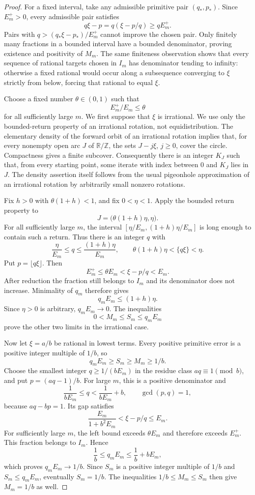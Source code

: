 \documentclass[11pt,a4paper]{article}
\theoremstyle{definition}
\theoremstyle{remark}
\begin{document}
\begin{proof}
For a fixed interval, take any admissible primitive pair $(q_*,p_*)$.
Since $E_m^+>0$, every admissible pair satisfies
\[
 q\xi-p=q(\xi-p/q)\ge qE_m^+.
\]
Pairs with $q>(q_*\xi-p_*)/E_m^+$ cannot improve the chosen pair.
Only finitely many fractions in a bounded interval have a bounded
denominator, proving existence and positivity of $M_m$.
The same finiteness observation shows that every sequence of rational
targets chosen in $I_m$ has denominator tending to infinity: otherwise
a fixed rational would occur along a subsequence converging to $\xi$
strictly from below, forcing that rational to equal $\xi$.

Choose a fixed number $\theta\in(0,1)$ such that
\[
 E_m^+/E_m\le\theta
\]
for all sufficiently large $m$. We first suppose that $\xi$ is irrational.
We use only the bounded-return property of an irrational rotation, not
equidistribution. The elementary density of the forward orbit of an
irrational rotation implies that, for every nonempty open arc $J$ of
$\mathbb R/\mathbb Z$, the sets
$J-j\xi$, $j\ge0$, cover the circle. Compactness gives a finite subcover.
Consequently there is an integer $K_J$ such that, from every starting
point, some iterate with index between $0$ and $K_J$ lies in $J$.
The density assertion itself follows from the usual pigeonhole
approximation of an irrational rotation by arbitrarily small nonzero
rotations.

Fix $h>0$ with $\theta(1+h)<1$, and fix $0<\eta<1$. Apply the bounded
return property to
\[
 J=\bigl(\theta(1+h)\eta,\eta\bigr).
\]
For all sufficiently large $m$, the interval
$[\eta/E_m,(1+h)\eta/E_m]$ is long enough to contain such a return.
Thus there is an integer $q$ with
\[
 \frac{\eta}{E_m}\le q\le\frac{(1+h)\eta}{E_m},
 \qquad \theta(1+h)\eta<\{q\xi\}<\eta.
\]
Put $p=\lfloor q\xi\rfloor$. Then
\[
 E_m^+\le\theta E_m
   <\xi-p/q<E_m.
\]
After reduction the fraction still belongs to $I_m$ and its denominator
does not increase. Minimality of $q_m$ therefore gives
\[
 q_mE_m\le(1+h)\eta.
\]
Since $\eta>0$ is arbitrary, $q_mE_m\to0$. The inequalities
\[
 0<M_m\le S_m\le q_mE_m
\]
prove the other two limits in the irrational case.

Now let $\xi=a/b$ be rational in lowest terms. Every positive primitive
error is a positive integer multiple of $1/b$, so
\[
 q_mE_m\ge S_m\ge M_m\ge1/b.
\]
Choose the smallest integer $q\ge1/(bE_m)$ in the residue class
$aq\equiv1\pmod b$, and put $p=(aq-1)/b$. For large $m$, this is a
positive denominator and
\[
 \frac1{bE_m}\le q<\frac1{bE_m}+b,
 \qquad \gcd(p,q)=1,
\]
because $aq-bp=1$. Its gap satisfies
\[
 \frac{E_m}{1+b^2E_m}<\xi-p/q\le E_m.
\]
For sufficiently large $m$, the left bound exceeds $\theta E_m$ and
therefore exceeds $E_m^+$. This fraction belongs to $I_m$. Hence
\[
 \frac1b\le q_mE_m\le\frac1b+bE_m,
\]
which proves $q_mE_m\to1/b$. Since $S_m$ is a positive integer multiple
of $1/b$ and $S_m\le q_mE_m$, eventually $S_m=1/b$. The inequalities
$1/b\le M_m\le S_m$ then give $M_m=1/b$ as well.


\end{proof}
\end{document}
